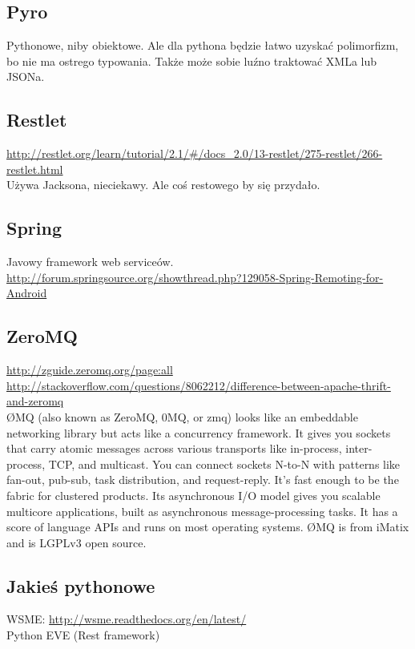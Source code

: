 \subsection{Pyro}
Pythonowe, niby obiektowe. Ale dla pythona będzie łatwo uzyskać polimorfizm, bo nie ma ostrego typowania. Także może sobie luźno traktować XMLa lub JSONa.


\subsection{Restlet}
\url{http://restlet.org/learn/tutorial/2.1/#/docs_2.0/13-restlet/275-restlet/266-restlet.html}\\
Używa Jacksona, nieciekawy. Ale coś restowego by się przydało.


\subsection{Spring}
Javowy framework web serviceów.
\url{http://forum.springsource.org/showthread.php?129058-Spring-Remoting-for-Android}\\


\subsection{ZeroMQ}
\url{http://zguide.zeromq.org/page:all}
\url{http://stackoverflow.com/questions/8062212/difference-between-apache-thrift-and-zeromq}\\
ØMQ (also known as ZeroMQ, 0MQ, or zmq) looks like an embeddable networking library but acts like a concurrency framework. It gives you sockets that carry atomic messages across various transports like in-process, inter-process, TCP, and multicast. You can connect sockets N-to-N with patterns like fan-out, pub-sub, task distribution, and request-reply. It's fast enough to be the fabric for clustered products. Its asynchronous I/O model gives you scalable multicore applications, built as asynchronous message-processing tasks. It has a score of language APIs and runs on most operating systems. ØMQ is from iMatix and is LGPLv3 open source.



\subsection{Jakieś pythonowe}
WSME: \url{http://wsme.readthedocs.org/en/latest/}\\
Python EVE (Rest framework)\\


